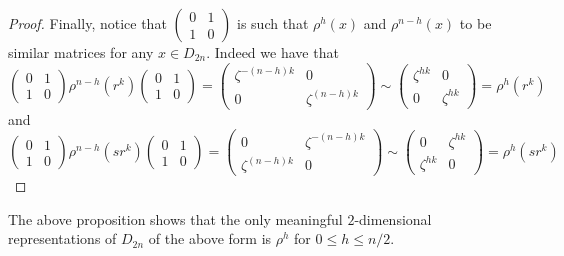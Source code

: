 \documentclass[a4paper]{article}
\begin{document}
\begin{prp}{}{}
\begin{proof}
Finally, notice that $\begin{pmatrix}
0 & 1\\
1 & 0
\end{pmatrix}$ is such that $\rho^h(x)$ and $\rho^{n-h}(x)$ to be similar matrices for any $x\in D_{2n}$. Indeed we have that $$\begin{pmatrix}
0 & 1\\
1 & 0
\end{pmatrix}\rho^{n-h}(r^k)\begin{pmatrix}
0 & 1\\
1 & 0
\end{pmatrix}=\begin{pmatrix}
\zeta^{-(n-h)k} & 0\\
0 & \zeta^{(n-h)k}
\end{pmatrix}\sim\begin{pmatrix}
\zeta^{hk} & 0\\
0 & \zeta^{hk}
\end{pmatrix}=\rho^h(r^k)$$ and $$\begin{pmatrix}
0 & 1\\
1 & 0
\end{pmatrix}\rho^{n-h}(sr^k)\begin{pmatrix}
0 & 1\\
1 & 0
\end{pmatrix}=\begin{pmatrix}
0 & \zeta^{-(n-h)k}\\
\zeta^{(n-h)k} & 0
\end{pmatrix}\sim\begin{pmatrix}
0 & \zeta^{hk}\\
\zeta^{hk} & 0
\end{pmatrix}=\rho^h(sr^k)$$
\end{proof}
\end{prp}

The above proposition shows that the only meaningful $2$-dimensional representations of $D_{2n}$ of the above form is $\rho^h$ for $0\leq h\leq n/2$. 
\end{document}
